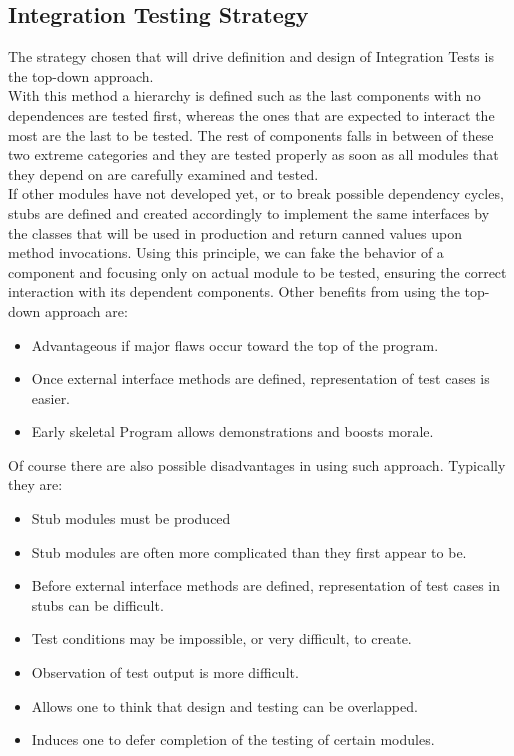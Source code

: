 \subsection{Integration Testing Strategy}
The strategy chosen that will drive definition and design of Integration Tests is the top-down approach. \\
With this method a hierarchy is defined such as the last components with no dependences are tested first, whereas the ones that are expected to interact the most are the last to be tested. The rest of components falls in between of these two extreme categories and they are tested properly as soon as all modules that they depend on are carefully examined and tested. \\
If other modules have not developed yet, or to break possible dependency cycles, stubs are defined and created accordingly to implement the same interfaces by the classes that will be used in production and return canned values upon method invocations. Using this principle, we can fake the behavior of a component and focusing only on actual module to be tested, ensuring the correct interaction with its dependent components.
Other benefits from using the top-down approach are:
\begin{itemize}
	\item Advantageous if major flaws occur toward the top of the program.
	\item Once external interface methods are defined, representation of test cases is easier.
	\item Early skeletal Program allows demonstrations and boosts morale.
\end{itemize}
Of course there are also possible disadvantages in using such approach. Typically they are:
\begin{itemize}
	\item Stub modules must be produced
	\item Stub modules are often more complicated than they first appear to be.
	\item Before external interface methods are defined, representation of test cases in stubs can be difficult.
	\item Test conditions may be impossible, or very difficult, to create.
	\item Observation of test output is more difficult.
	\item Allows one to think that design and testing can be overlapped.
	\item Induces one to defer completion of the testing of certain modules.
\end{itemize}
\break
